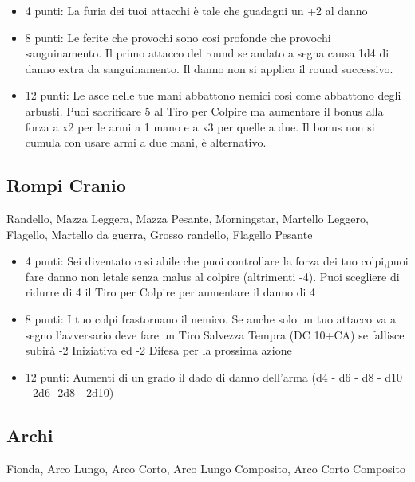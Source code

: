 \documentclass[a4paper,11pt,twoside,openany]{book}
\begin{document}
\begin{itemize}

	\item 4 punti: La furia dei tuoi attacchi è tale che guadagni un +2 al danno

	\item 8 punti: Le ferite che provochi sono cosi profonde che provochi sanguinamento. Il primo attacco del round se andato a segna causa 1d4 di danno extra da sanguinamento. Il danno non si applica il round successivo.

	\item 12 punti: Le asce nelle tue mani abbattono nemici cosi come abbattono degli arbusti. Puoi sacrificare 5 al Tiro per Colpire ma aumentare il bonus alla forza a x2 per le armi a 1 mano e a x3 per quelle a due. Il bonus non si cumula con usare armi a due mani, è alternativo.

\end{itemize}

\subsection{Rompi Cranio} Randello, Mazza Leggera, Mazza Pesante, Morningstar, Martello Leggero, Flagello, Martello da guerra, Grosso randello, Flagello Pesante

\begin{itemize}
	\item 4 punti: Sei diventato cosi abile che puoi controllare la forza dei tuo colpi,puoi fare danno non letale senza malus al colpire (altrimenti -4). Puoi scegliere di ridurre di 4 il Tiro per Colpire per aumentare il danno di 4

	\item 8 punti: I tuo colpi frastornano il nemico. Se anche solo un tuo attacco va a segno l'avversario deve fare un Tiro Salvezza Tempra (DC 10+CA) se fallisce subirà -2 Iniziativa ed -2 Difesa per la prossima azione

	\item 12 punti: Aumenti di un grado il dado di danno dell'arma (d4 - d6 - d8 - d10 - 2d6 -2d8 - 2d10)
\end{itemize}

\subsection{Archi} Fionda, Arco Lungo, Arco Corto, Arco Lungo Composito, Arco Corto Composito
\end{document}
